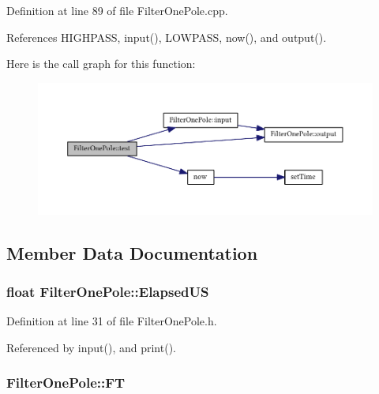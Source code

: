 Definition at line 89 of file Filter\+One\+Pole.\+cpp.



References H\+I\+G\+H\+P\+A\+SS, input(), L\+O\+W\+P\+A\+SS, now(), and output().



Here is the call graph for this function\+:
\nopagebreak
\begin{figure}[H]
\begin{center}
\leavevmode
\includegraphics[width=350pt]{struct_filter_one_pole_a5b54248319d02b3f15d93e6333339389_cgraph}
\end{center}
\end{figure}




\subsection{Member Data Documentation}
\subsubsection[{\texorpdfstring{Elapsed\+US}{ElapsedUS}}]{\setlength{\rightskip}{0pt plus 5cm}float Filter\+One\+Pole\+::\+Elapsed\+US}\hypertarget{struct_filter_one_pole_a0a611284884d31840b2169547f072fba}{}\label{struct_filter_one_pole_a0a611284884d31840b2169547f072fba}


Definition at line 31 of file Filter\+One\+Pole.\+h.



Referenced by input(), and print().

\subsubsection[{\texorpdfstring{FT}{FT}}]{ Filter\+One\+Pole\+::\+FT}\hypertarget{struct_filter_one_pole_aed9400fc1b781fc227344d67509394a4}{}\label{struct_filter_one_pole_aed9400fc1b781fc227344d67509394a4}


